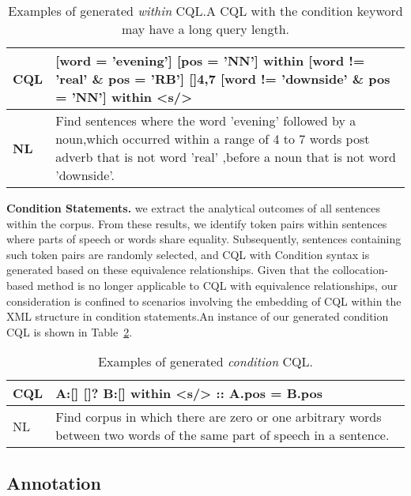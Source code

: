 \documentclass[11pt]{article}
\begin{document}
\begin{CJK*}{UTF8}{gbsn}
\begin{table}
    \centering
    \begin{tabular}{|p{3em}|p{15em}|} %
    \hline
    \textbf{CQL} &[word = 'evening'] [pos = 'NN']  within  [word != 'real' \& pos = 'RB'] []{4,7} [word != 'downside' \& pos = 'NN'] within  <s/>   \\
    \hline
    \textbf{NL}&  Find sentences where the word 'evening' followed by a noun,which occurred within a range of 4 to 7 words post adverb that is not word 'real' ,before a noun that is not word 'downside'. \\
    \hline
    \end{tabular}
    \caption{Examples of generated \emph{within} CQL.A CQL with the condition keyword may have a long query length.}
    \label{tab:within_example}
\end{table}


\textbf{Condition Statements. }
we extract the analytical outcomes of all sentences within the corpus. From these results, we identify token pairs within sentences where parts of speech or words share equality. Subsequently, sentences containing such token pairs are randomly selected, and CQL with Condition syntax is generated based on these equivalence relationships. Given that the collocation-based method is no longer applicable to CQL with equivalence relationships, our consideration is confined to scenarios involving the embedding of CQL within the XML structure in condition statements.An instance of our generated condition CQL is shown in Table~\ref{tab:condition_example}.

\begin{table}
    \centering
    \begin{tabular}{|p{3em}|p{15em}|} %
    \hline
    CQL & A:[] []? B:[] within <s/> :: A.pos = B.pos \\
    \hline
    NL & Find corpus in which there are zero or one arbitrary words between two words of the same part of speech in a sentence. \\
    \hline
    \end{tabular}
    \caption{Examples of generated \emph{condition} CQL.}
    \label{tab:condition_example}
\end{table}

\subsection{Annotation}


\end{CJK*}
\end{document}
